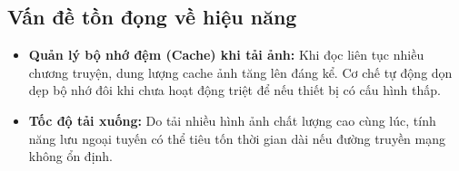 \subsection{Vấn đề tồn đọng về hiệu năng}
\begin{itemize}
    \item \textbf{Quản lý bộ nhớ đệm (Cache) khi tải ảnh:} Khi đọc liên tục nhiều chương truyện, dung lượng cache ảnh tăng lên đáng kể. Cơ chế tự động dọn dẹp bộ nhớ đôi khi chưa hoạt động triệt để nếu thiết bị có cấu hình thấp.
    \item \textbf{Tốc độ tải xuống:} Do tải nhiều hình ảnh chất lượng cao cùng lúc, tính năng lưu ngoại tuyến có thể tiêu tốn thời gian dài nếu đường truyền mạng không ổn định.
\end{itemize}